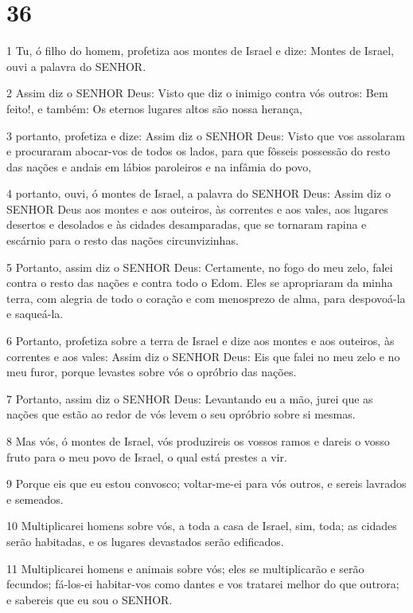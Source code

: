 \chapter{36}

\par 1 Tu, ó filho do homem, profetiza aos montes de Israel e dize: Montes de Israel, ouvi a palavra do SENHOR.
\par 2 Assim diz o SENHOR Deus: Visto que diz o inimigo contra vós outros: Bem feito!, e também: Os eternos lugares altos são nossa herança,
\par 3 portanto, profetiza e dize: Assim diz o SENHOR Deus: Visto que vos assolaram e procuraram abocar-vos de todos os lados, para que fôsseis possessão do resto das nações e andais em lábios paroleiros e na infâmia do povo,
\par 4 portanto, ouvi, ó montes de Israel, a palavra do SENHOR Deus: Assim diz o SENHOR Deus aos montes e aos outeiros, às correntes e aos vales, aos lugares desertos e desolados e às cidades desamparadas, que se tornaram rapina e escárnio para o resto das nações circunvizinhas.
\par 5 Portanto, assim diz o SENHOR Deus: Certamente, no fogo do meu zelo, falei contra o resto das nações e contra todo o Edom. Eles se apropriaram da minha terra, com alegria de todo o coração e com menosprezo de alma, para despovoá-la e saqueá-la.
\par 6 Portanto, profetiza sobre a terra de Israel e dize aos montes e aos outeiros, às correntes e aos vales: Assim diz o SENHOR Deus: Eis que falei no meu zelo e no meu furor, porque levastes sobre vós o opróbrio das nações.
\par 7 Portanto, assim diz o SENHOR Deus: Levantando eu a mão, jurei que as nações que estão ao redor de vós levem o seu opróbrio sobre si mesmas.
\par 8 Mas vós, ó montes de Israel, vós produzireis os vossos ramos e dareis o vosso fruto para o meu povo de Israel, o qual está prestes a vir.
\par 9 Porque eis que eu estou convosco; voltar-me-ei para vós outros, e sereis lavrados e semeados.
\par 10 Multiplicarei homens sobre vós, a toda a casa de Israel, sim, toda; as cidades serão habitadas, e os lugares devastados serão edificados.
\par 11 Multiplicarei homens e animais sobre vós; eles se multiplicarão e serão fecundos; fá-los-ei habitar-vos como dantes e vos tratarei melhor do que outrora; e sabereis que eu sou o SENHOR.
